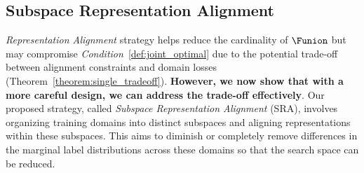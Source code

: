 




\subsection{Subspace Representation Alignment}

\textit{Representation Alignment} strategy helps reduce the cardinality of $\Funion$ but may compromise \textit{Condition}~\ref{def:joint_optimal} due to the potential trade-off between alignment constraints and domain losses (Theorem~\ref{theorem:single_tradeoff}). \textbf{However, we now show that with a more careful design, we can address the trade-off effectively}. Our proposed strategy, called \textit{Subspace Representation Alignment} (SRA), involves organizing training domains into distinct subspaces and aligning representations within these subspaces. 
This aims to diminish or completely remove differences in the marginal label distributions across these domains so that the search space can be reduced. 

